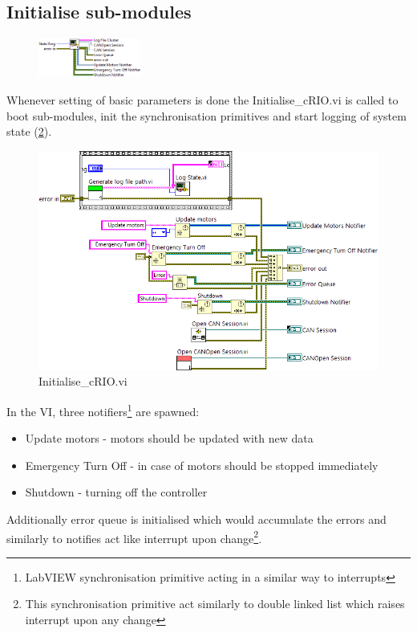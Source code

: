 \subsection{Initialise sub-modules}
\begin{figure}
    \vspace{-15pt}
    \centering
    \includegraphics[width=0.3\textwidth]{figures/Initialise_cRIOc}
    \caption*{}
    \label{vi:init_crioc}
    \vspace{-15pt}
\end{figure}
Whenever setting of basic parameters is done the Initialise\_cRIO.vi is called to boot sub-modules, init the synchronisation primitives and start logging of system state (\ref{vi:init_crioc}).
\begin{figure}[!h]
    \centering
    \includegraphics[width=\textwidth]{figures/Initialise_cRIOd.png}
    \caption{Initialise\_cRIO.vi}
    \label{vi:init_crioc}
\end{figure}

In the VI, three notifiers\footnote{LabVIEW synchronisation primitive acting in a similar way to interrupts} are spawned:
\begin{itemize}
    \item Update motors - motors should be updated with new data
    \item Emergency Turn Off - in case of motors should be stopped immediately
    \item Shutdown - turning off the controller
\end{itemize}
Additionally error queue is initialised which would accumulate the errors and similarly to notifies act like interrupt upon change\footnote{This synchronisation primitive act similarly to double linked list which raises interrupt upon any change}.

